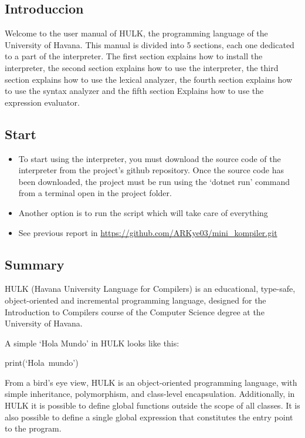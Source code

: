 \newcommand{\copiabletext}[2]{%
    \href{#2}{\texttt{#1}}%
}

\begin{center}
    \centering
    \section{Introduccion}
\end{center}
Welcome to the user manual of HULK, the programming language of the University of Havana. This manual is divided into 5 sections, each one dedicated to a part of the interpreter. The first section explains how to install the interpreter, the second section explains how to use the interpreter, the third section explains how to use the lexical analyzer, the fourth section explains how to use the syntax analyzer and the fifth section Explains how to use the expression evaluator.

\subsection{Start}
    \begin{itemize}
        \item To start using the interpreter, you must download the source code of the interpreter from the project's github repository. Once the source code has been downloaded, the project must be run using the `dotnet run' command from a terminal open in the project folder.
        \item Another option is to run the script which will take care of everything
        \item See previous report in \url{https://github.com/ARKye03/mini_kompiler.git}
    \end{itemize}
    
\subsection{Summary}
HULK (Havana University Language for Compilers) is an educational, type-safe, object-oriented and incremental programming language, designed for the Introduction to Compilers course of the Computer Science degree at the University of Havana.

A simple `Hola Mundo' in HULK looks like this:

    \hbox{print(`Hola mundo')}

    From a bird's eye view, HULK is an object-oriented programming language, with simple inheritance, polymorphism, and class-level encapsulation. Additionally, in HULK it is possible to define global functions outside the scope of all classes. It is also possible to define a single global expression that constitutes the entry point to the program.

